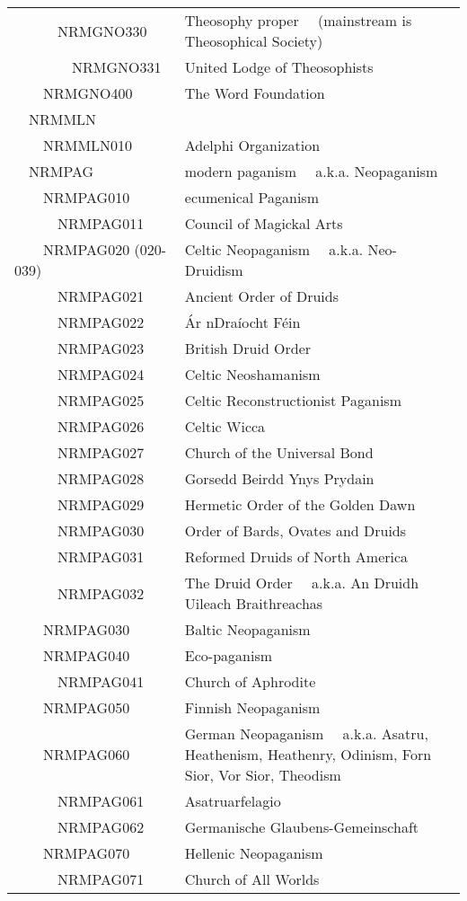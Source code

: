 \documentclass[12pt]{article}
\begin{document}
\begin{tiny}
\begin{center}
\begin{longtable}{|l|l|}
~~~~~~NRMGNO330 & Theosophy proper	~~(mainstream is Theosophical Society) \\
~~~~~~~~NRMGNO331 & United Lodge of Theosophists \\
~~~~NRMGNO400 & The Word Foundation \\
~~NRMMLN \\
~~~~NRMMLN010 & Adelphi Organization \\
~~NRMPAG & modern paganism	~~a.k.a. Neopaganism \\
~~~~NRMPAG010 & ecumenical Paganism \\
~~~~~~NRMPAG011 & Council of Magickal Arts \\
~~~~NRMPAG020 (020-039) & Celtic Neopaganism	~~a.k.a. Neo-Druidism \\
~~~~~~NRMPAG021 & Ancient Order of Druids \\
~~~~~~NRMPAG022 & Ár nDraíocht Féin \\
~~~~~~NRMPAG023 & British Druid Order \\
~~~~~~NRMPAG024 & Celtic Neoshamanism \\
~~~~~~NRMPAG025 & Celtic Reconstructionist Paganism \\
~~~~~~NRMPAG026 & Celtic Wicca \\
~~~~~~NRMPAG027 & Church of the Universal Bond \\
~~~~~~NRMPAG028 & Gorsedd Beirdd Ynys Prydain \\
~~~~~~NRMPAG029 & Hermetic Order of the Golden Dawn \\
~~~~~~NRMPAG030 & Order of Bards, Ovates and Druids \\
~~~~~~NRMPAG031 & Reformed Druids of North America \\
~~~~~~NRMPAG032 & The Druid Order	~~a.k.a. An Druidh Uileach Braithreachas \\
~~~~NRMPAG030 & Baltic Neopaganism \\
~~~~NRMPAG040 & Eco-paganism \\
~~~~~~NRMPAG041 & Church of Aphrodite \\
~~~~NRMPAG050 & Finnish Neopaganism \\
~~~~NRMPAG060 & German Neopaganism	~~a.k.a. Asatru, Heathenism, Heathenry, Odinism, Forn Sior, Vor Sior, Theodism \\
~~~~~~NRMPAG061 & Asatruarfelagio \\
~~~~~~NRMPAG062 & Germanische Glaubens-Gemeinschaft \\
~~~~NRMPAG070 & Hellenic Neopaganism \\
~~~~~~NRMPAG071 & Church of All Worlds \\

\end{longtable}
\end{center}
\end{tiny}
\end{document}
